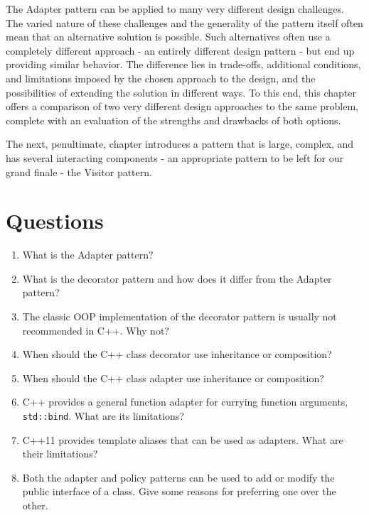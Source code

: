 The Adapter pattern can be applied to many very different design challenges. The varied nature of these challenges and the generality of the pattern itself often mean that an alternative solution is possible. Such alternatives often use a completely different approach - an entirely different design pattern - but end up providing similar behavior. The difference lies in trade-offs, additional conditions, and limitations imposed by the chosen approach to the design, and the possibilities of extending the solution in different ways. To this end, this chapter offers a comparison of two very different design approaches to the same problem, complete with an evaluation of the strengths and drawbacks of both options.

The next, penultimate, chapter introduces a pattern that is large, complex, and has several interacting components - an appropriate pattern to be left for our grand finale - the Visitor pattern.

\section{Questions}

\begin{enumerate}
\item
  What is the Adapter pattern?
\item
  What is the decorator pattern and how does it differ from the Adapter pattern?
\item
  The classic OOP implementation of the decorator pattern is usually not recommended in C++. Why not?
\item
  When should the C++ class decorator use inheritance or composition?
\item
  When should the C++ class adapter use inheritance or composition?
\item
  C++ provides a general function adapter for currying function arguments, \texttt{std::bind}. What are its limitations?
\item
  C++11 provides template aliases that can be used as adapters. What are their limitations?
\item
  Both the adapter and policy patterns can be used to add or modify the public interface of a class. Give some reasons for preferring one over the other.
\end{enumerate}

